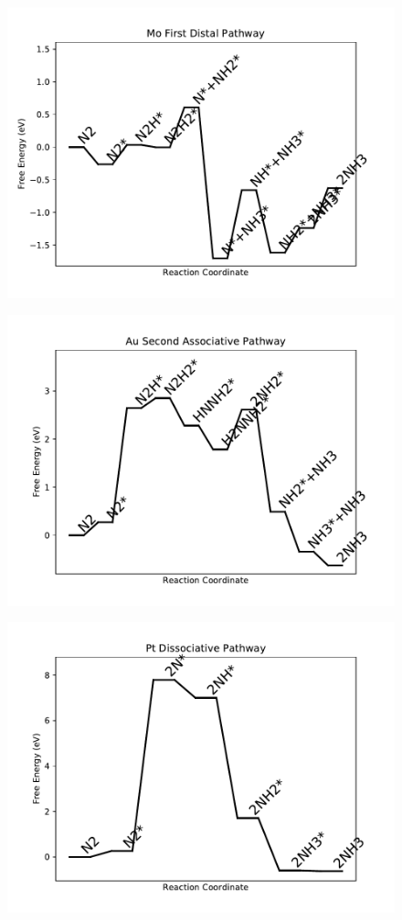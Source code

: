 \begin{figure}
\includegraphics[width=0.8\linewidth]{data/plots/Mo_distal_1.pdf}
\end{figure}

\begin{figure}
\includegraphics[width=0.8\linewidth]{data/plots/Au_associative_2.pdf}
\end{figure}

\begin{figure}
\includegraphics[width=0.8\linewidth]{data/plots/Pt_dissociative.pdf}
\end{figure}

